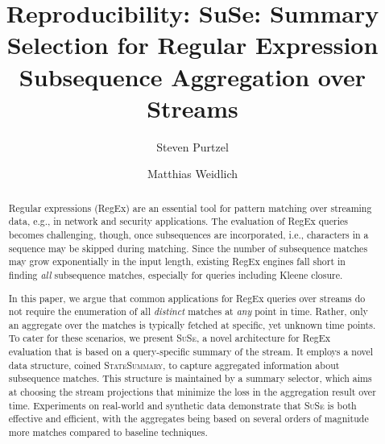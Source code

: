 \documentclass[acmsmall]{acmart}
\newcommand{\suse}{\textsc{SuSe\xspace{}}}
\begin{document}
\title{Reproducibility: SuSe: Summary Selection for Regular Expression Subsequence Aggregation over Streams}

\author{Steven Purtzel}


\author{Matthias Weidlich}

\renewcommand{\shortauthors}{Steven Purtzel and Matthias Weidlich}

\begin{abstract}
	Regular expressions (RegEx) are an essential tool for pattern matching over
	streaming data, e.g., in network and security applications. The
	evaluation of RegEx queries becomes challenging, though, once subsequences are
	incorporated, i.e., characters in a sequence may be skipped during
	matching.
	Since the number of subsequence matches may grow exponentially in the input
	length, existing RegEx engines fall short in finding \emph{all} subsequence
	matches, especially for queries including Kleene closure.

	In this paper, we argue that common applications for RegEx queries
	over streams do not require the enumeration of all \emph{distinct} matches at
	\emph{any} point in
	time. Rather, only an aggregate over the matches is typically fetched at
	specific, yet
	unknown time points. To cater for these scenarios, we present \suse{}, a novel
	architecture for RegEx evaluation that is based on a query-specific summary of
	the stream. It employs a novel data structure, coined
	\textsc{StateSummary}, to capture aggregated information about subsequence
	matches. This structure is maintained by a summary
	selector, which aims at choosing the stream projections that minimize the loss
	in the aggregation result over time.
	Experiments on real-world and synthetic data demonstrate that \suse{}
	is both effective and efficient, with the aggregates being based on several orders
	of magnitude more matches compared to baseline techniques.
	\end{abstract}
\end{document}
